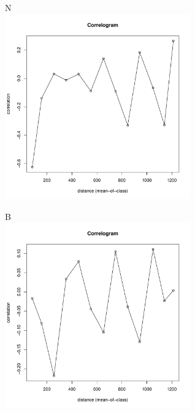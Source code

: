 	\begin{figure}[h]
	\begin{minipage}[b]{.46\linewidth}
	\begin{center}
	{\small N}\\
	\includegraphics[width=80mm]{../Barenc_Sea/distribution_Moran/Yarnyshnaya07_moran_N_Macoma_balthica_.pdf}
	\end{center}
	\end{minipage}
%
	\hfil %
%
	\begin{minipage}[b]{.46\linewidth}
	\begin{center}
	{\small B}\\
		\includegraphics[width=80mm]{../Barenc_Sea/distribution_Moran/Yarnyshnaya07_moran_B_Macoma_balthica_.pdf}
	\end{center}
	\end{minipage}
	

\end{figure}
